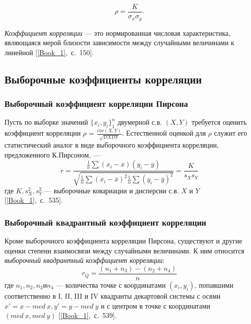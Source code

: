 \documentclass[12pt,a4paper]{article}
\begin{document}
	\begin{equation}\label{eqn:cor_coef}
	\rho = \frac{K}{\sigma_x\sigma_y}.
	\end{equation}
	
	\emph{Коэффициент корреляции} --- это нормированная числовая характеристика, являющаяся мерой близости зависимости между случайными величинами
	к линейной [\ref{Book_1},~с.~150].
	
	\subsection{Выборочные коэффициенты корреляции}
	\subsubsection{Выборочный коэффициент корреляции Пирсона}
	Пусть по выборке значений $\{{x_i, y_i}\}^n_1$ двумерной с.в. $(X, Y)$ требуется оценить коэффициент корреляции $\rho$ = $\frac{cov(X, Y)}{\sqrt{DX DY}}$. Естественной оценкой для $\rho$ служит его статистический аналог в виде выборочного коэффициента корреляции, предложенного К.Пирсоном, ---
	\begin{equation}\label{eqn:pears}
	r = \frac{\frac{1}{n} \sum(x_i - \overline{x})(y_i - \overline{y})}{\sqrt{\frac{1}{n} \sum (x_i - \overline{x})^2 \frac{1}{n} \sum(y_i - \overline{y})^2}} = \frac{K}{s_X s_Y}
	\end{equation}
	где $K, s^2_X, s^2_Y$ --- выборочные ковариации и дисперсии с.в. $X$ и $Y$ [\ref{Book_1},~с.~535].
	
	\subsubsection{Выборочный квадрантный коэффициент корреляции}
	Кроме выборочного коэффициента корреляции Пирсона, существуют и другие оценки степени взаимосвязи между случайными величинами. К ним относится \emph{выборочный квадрантный коэффициент корреляции}:
	\begin{equation}\label{eqn:quad}
	r_Q = \frac{(n_1 + n_3) - (n_2 + n_4)}{n}
	\end{equation}
	где $n_1, n_2, n_3 и n_4$ --- количества точке с координатами $(x_i, y_i)$, попавшими
	соответственно в I, II, III и IV квадранты декартовой системы с осями $x' = x - med\:x, y' = y - med\:y$ и с центром в точке с координатами $(med\:x, med\:y)$ [\ref{Book_1},~с.~539].
	
\end{document}
